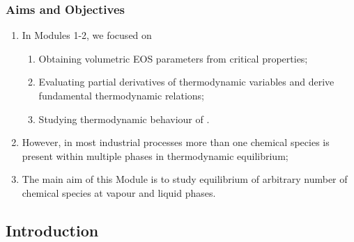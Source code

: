 \documentclass[10pt,compress,unknownkeysallowed]{beamer}
\begin{document}
\begin{frame}
 \frametitle{Aims and Objectives}
   \begin{enumerate}
     \item<1-> In Modules 1-2, we focused on 
       \begin{enumerate}
         \item<1-> Obtaining volumetric EOS parameters from critical properties;
         \item<1-> Evaluating partial derivatives of thermodynamic variables and derive fundamental thermodynamic relations;
         \item<1-> Studying thermodynamic behaviour of  .
       \end{enumerate} 
     \item<2-> However, in most industrial processes more than one chemical species is present within multiple phases in thermodynamic equilibrium;
     \item<3-> The main aim of this Module is to study equilibrium of arbitrary number of chemical species at vapour and liquid phases.
   \end{enumerate}
\end{frame}




\subsection{Introduction} 
\end{document}
